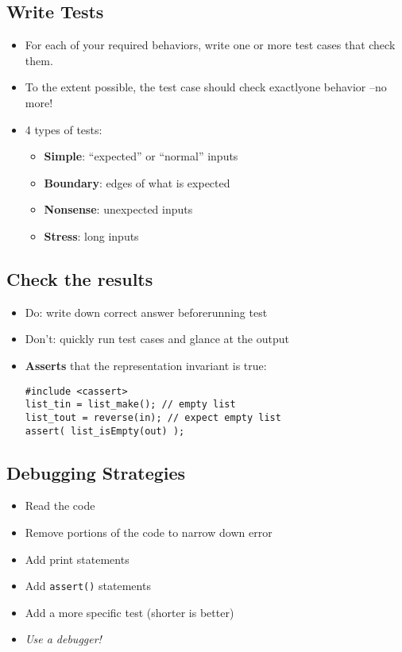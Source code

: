 \subsection{Write Tests}
\begin{itemize}
	\item For each of your required behaviors, write one or more test cases that check them.
	\item To the extent possible, the test case should check exactlyone behavior –no more!
	\item 4 types of tests:
	\begin{itemize}
		\item \textbf{Simple}: ``expected'' or ``normal'' inputs
		\item \textbf{Boundary}: edges of what is expected
		\item \textbf{Nonsense}: unexpected inputs
		\item \textbf{Stress}: long inputs
	\end{itemize}
\end{itemize}

\subsection{Check the results}
\begin{itemize}
	\item Do: write down correct answer beforerunning test
	\item Don't: quickly run test cases and glance at the output
	\item \textbf{Asserts} that the representation invariant is true:
\begin{lstlisting}[style=C++]
#include <cassert>
list_tin = list_make(); // empty list
list_tout = reverse(in); // expect empty list
assert( list_isEmpty(out) );
\end{lstlisting}
\end{itemize}

\subsection{Debugging Strategies}
\begin{itemize}
	\item Read the code
	\item Remove portions of the code to narrow down error
	\item Add print statements
	\item Add \lstinline[style=C++]{assert()} statements
	\item Add a more specific test (shorter is better)
	\item \textit{Use a debugger!}
\end{itemize}

